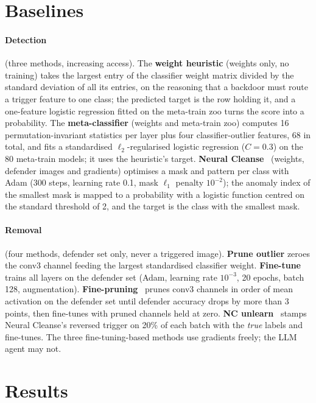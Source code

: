 \documentclass[11pt]{article}
\begin{document}
\section{Baselines}
\label{sec:methods}
\paragraph{Detection} (three methods, increasing access).
The \textbf{weight heuristic} (weights only, no training) takes the largest entry of the classifier
weight matrix divided by the standard deviation of all its entries, on the reasoning that a backdoor
must route a trigger feature to one class; the predicted target is the row holding it, and a
one-feature logistic regression fitted on the meta-train zoo turns the score into a probability. The
\textbf{meta-classifier} (weights and meta-train zoo) computes 16 permutation-invariant statistics per
layer plus four classifier-outlier features, 68 in total, and fits a standardised
$\ell_2$-regularised logistic regression ($C{=}0.3$) on the 80 meta-train models; it uses the
heuristic's target. \textbf{Neural Cleanse}~\citep{wang2019neuralcleanse} (weights, defender images
and gradients) optimises a mask and pattern per class with Adam (300 steps, learning rate 0.1, mask
$\ell_1$ penalty $10^{-2}$); the anomaly index of the smallest mask is mapped to a probability with a
logistic function centred on the standard threshold of 2, and the target is the class with the
smallest mask.

\paragraph{Removal} (four methods, defender set only, never a triggered image).
\textbf{Prune outlier} zeroes the conv3 channel feeding the largest standardised classifier weight.
\textbf{Fine-tune} trains all layers on the defender set (Adam, learning rate $10^{-3}$, 20 epochs,
batch 128, augmentation). \textbf{Fine-pruning}~\citep{liu2018fineprune} prunes conv3 channels in
order of mean activation on the defender set until defender accuracy drops by more than 3 points,
then fine-tunes with pruned channels held at zero. \textbf{NC unlearn}~\citep{wang2019neuralcleanse}
stamps Neural Cleanse's reversed trigger on 20\% of each batch with the \emph{true} labels and
fine-tunes. The three fine-tuning-based methods use gradients freely; the LLM agent may not.

\section{Results}
\label{sec:results}
\end{document}

